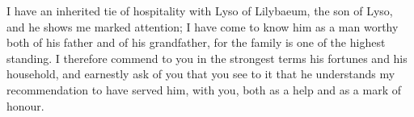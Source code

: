 

 I have an inherited tie of hospitality with Lyso of Lilybaeum, the son of Lyso, and he shows me marked attention; I have come to know him as a man worthy both of his father and of his grandfather, for the family is one of the highest standing. I therefore commend to you in the strongest terms his fortunes and his household, and earnestly ask of you that you see to it that he understands my recommendation to have served him, with you, both as a help and as a mark of honour.
